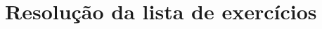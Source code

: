 \documentclass[
  12pt,     %
  openright,      %
  oneside,      %
  a4paper     %
  ]{abntex2}
\begin{document}

\frenchspacing


\imprimircapa

\imprimirfolhaderosto

\tableofcontents*
\cleardoublepage

\textual

\chapter{Resolução da lista de exercícios}

\end{document}
